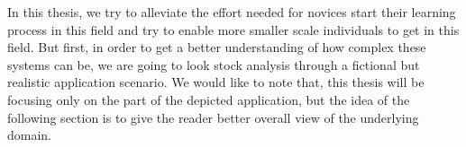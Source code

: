 In this thesis, we try to alleviate the effort needed for novices start their learning process in this field and try to enable more smaller scale individuals to get in this field.
But first, in order to get a better understanding of how complex these systems can be, we are going to look stock analysis through a fictional but realistic application scenario.
We would like to note that, this thesis will be focusing only on the part of the depicted application, but the idea of the following section is to give the reader better overall view of the underlying domain.




